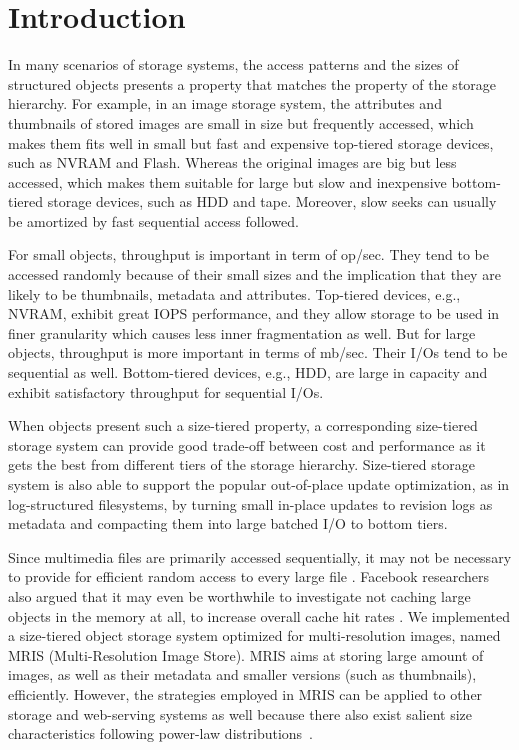 \section{Introduction}
\label{intro}

In many scenarios of storage systems, the access patterns and the
sizes of structured objects presents a property that matches the
property of the storage hierarchy. For example, in an image storage
system, the attributes and thumbnails of stored images are small in
size but frequently accessed, which makes them fits well in small but
fast and expensive top-tiered storage devices, such as NVRAM and
Flash.  Whereas the original images are big but less accessed, which
makes them suitable for large but slow and inexpensive bottom-tiered
storage devices, such as HDD and tape.  Moreover, slow seeks can
usually be amortized by fast sequential access followed.

For small objects, throughput is important in term of op/sec. They
tend to be accessed randomly because of their small sizes and the
implication that they are likely to be thumbnails, metadata and
attributes.  Top-tiered devices, e.g., NVRAM, exhibit great IOPS
performance, and they allow storage to be used in finer granularity
which causes less inner fragmentation as well. But for large objects,
throughput is more important in terms of mb/sec. Their I/Os tend to be
sequential as well. Bottom-tiered devices, e.g., HDD, are large in
capacity and exhibit satisfactory throughput for sequential I/Os. 

When objects present such a size-tiered property, a corresponding
size-tiered storage system can provide good trade-off between cost and
performance as it gets the best from different tiers of the storage
hierarchy. Size-tiered storage system is also able to support the
popular out-of-place update optimization, as in log-structured
filesystems, by turning small in-place updates to revision logs as
metadata and compacting them into large batched I/O to bottom tiers.

Since multimedia files are primarily accessed sequentially, it may not
be necessary to provide for efficient random access to every large
file \cite{evans2002study}.  Facebook researchers also argued that it
may even be worthwhile to investigate not caching large objects in the
memory at all, to increase overall cache hit rates
\cite{kvworkload_sigmetrics}.  We implemented a size-tiered object
storage system optimized for multi-resolution images, named MRIS
(Multi-Resolution Image Store).  MRIS aims at storing large amount of
images, as well as their metadata and smaller versions (such as
thumbnails), efficiently. However, the strategies employed in MRIS can
be applied to other storage and web-serving systems as well because
there also exist salient size characteristics following power-law
distributions~\cite{kvworkload_sigmetrics}.


